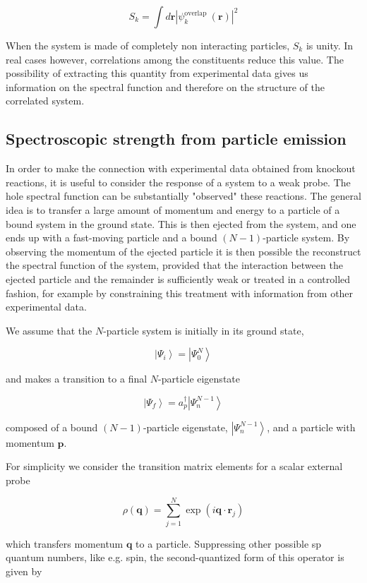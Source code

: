 {$$
S_{k}=\int d \mathbf{r}\left|\psi_{k}^{\text {overlap }}(\mathbf{r})\right|^{2}
$$

When the system is made of completely non interacting particles,
$S_{k}$ is unity. In real cases however, correlations among the
constituents reduce this value. The possibility of extracting this
quantity from experimental data gives us information on the spectral
function and therefore on the structure of the correlated system.


\subsection{Spectroscopic strength from particle emission}

In order to make the connection with experimental data obtained from
knockout reactions, it is useful to consider the response of a system
to a weak probe. The hole spectral function
can be substantially "observed" these reactions. The general idea is
to transfer a large amount of momentum and energy to a particle of a
bound system in the ground state. This is then ejected from the
system, and one ends up with a fast-moving particle and a bound
$(N-1)$-particle system. By observing the momentum of the ejected
particle it is then possible the reconstruct the spectral function of
the system, provided that the interaction between the ejected particle
and the remainder is sufficiently weak or treated in a controlled
fashion, for example by constraining this treatment with information from
other experimental data.

We assume that the $N$-particle system is initially in its ground state,

$$
\left|\Psi_{i}\right\rangle=\left|\Psi_{0}^{N}\right\rangle
$$

and makes a transition to a final $N$-particle eigenstate

$$
\left|\Psi_{f}\right\rangle=a_{p}^{\dagger}\left|\Psi_{n}^{N-1}\right\rangle
$$

composed of a bound $(N-1)$-particle eigenstate, $\left|\Psi_{n}^{N-1}\right\rangle$, and a particle with momentum $\boldsymbol{p}$.


For simplicity we consider the transition matrix elements for a scalar external probe

$$
\rho(\boldsymbol{q})=\sum_{j=1}^{N} \exp \left(i \boldsymbol{q} \cdot \boldsymbol{r}_{j}\right)
$$

which transfers momentum $\boldsymbol{q}$ to a particle. Suppressing other possible sp quantum numbers, like e.g. spin, the second-quantized form of this operator is given by

}
